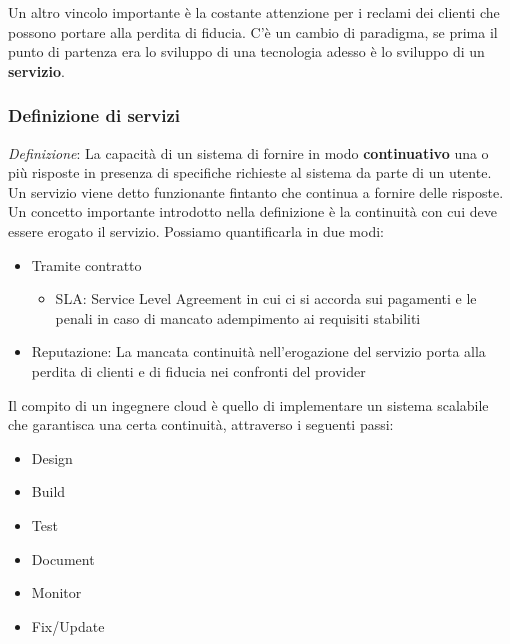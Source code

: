 \documentclass{article}
\begin{document}
		Un altro vincolo importante è la costante attenzione per i reclami dei clienti che possono portare alla perdita di fiducia.
		C'è un cambio di paradigma, se prima il punto di partenza era lo sviluppo di una tecnologia adesso è lo sviluppo di un \textbf{servizio}.
		
		\subsubsection{Definizione di servizi}
		\emph{Definizione}: La capacità di un sistema di fornire in modo \textbf{continuativo} una o più risposte in presenza di specifiche richieste al sistema da parte di un utente.\\
		Un servizio viene detto funzionante fintanto che continua a fornire delle risposte.\\
		
		Un concetto importante introdotto nella definizione è la continuità con cui deve essere erogato il servizio. Possiamo quantificarla in due modi:
		
		\begin{itemize}
		    \item Tramite contratto
		    \begin{itemize}
		        \item SLA: Service Level Agreement in cui ci si accorda sui pagamenti e le penali in caso di mancato adempimento ai requisiti stabiliti
		    \end{itemize}
		    \item Reputazione: La mancata continuità nell'erogazione del servizio porta alla perdita di clienti e di fiducia nei confronti del provider
		\end{itemize}
		Il compito di un ingegnere cloud è quello di implementare un sistema scalabile che garantisca una certa continuità, attraverso i seguenti passi:
		
		\begin{itemize}
		    \item Design
		    \item Build
		    \item Test
		    \item Document
		    \item Monitor
		    \item Fix/Update
		\end{itemize}
		
\end{document}
